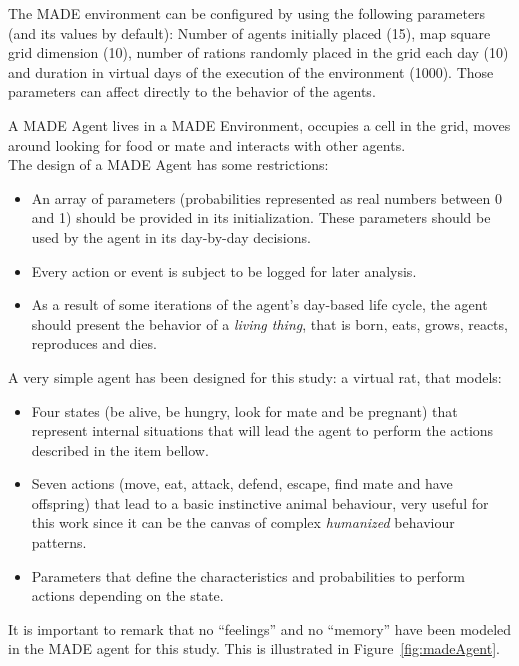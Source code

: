 \documentclass{sig-alternate}
\begin{document}
The MADE environment can be configured by using the following parameters (and its values by default): Number of agents initially placed (15), map square grid dimension (10), number of rations randomly placed in the grid each day (10) and duration in virtual days of the  execution of the environment (1000). Those parameters can affect directly to the behavior of the agents.



A MADE Agent lives in a MADE Environment, occupies a cell in the grid, moves around looking for food or mate and interacts with other agents.\\

The design of a MADE Agent has some restrictions:
\begin{itemize}
\item An array of parameters (probabilities represented as real numbers between 0 and 1) should be provided in its initialization. These parameters should be used by the agent in its day-by-day decisions.
\item Every action or event is subject to be logged for later analysis.
\item As a result of some iterations of the agent's day-based life cycle, the agent should present the behavior of a \textit{living thing}, that is born, eats, grows, reacts, reproduces and dies.  
\end{itemize}

A very simple agent has been designed for this study: a virtual
rat, that models:
\begin{itemize}
\item Four states (be alive, be hungry, look for
mate and be pregnant) that represent internal situations that will lead the
agent to perform the actions described in the item bellow. %
\item Seven actions (move, eat, attack, defend, escape,
find mate and have offspring) that lead to a basic instinctive animal
behaviour, very useful for this work since it can be the canvas of 
complex \textit{humanized} behaviour patterns.
\item Parameters that define the characteristics and probabilities to
perform actions depending on the state.
\end{itemize}
It is important to remark that no ``feelings'' and no ``memory''
have been modeled in the MADE agent for this study. This is
illustrated in Figure~\ref{fig:madeAgent}.
\end{document}

